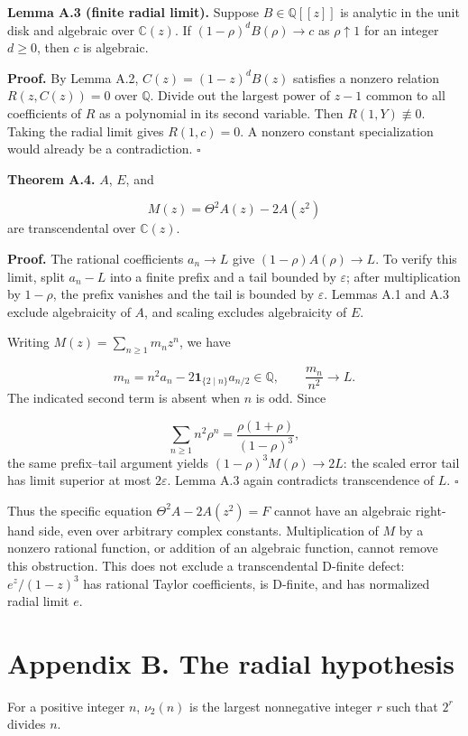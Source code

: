 \documentclass[11pt,a4paper]{article}
\begin{document}
\textbf{Lemma A.3 (finite radial limit).} Suppose $B\in\mathbb Q[[z]]$ is analytic in the unit disk and algebraic over $\mathbb C(z)$. If $(1-\rho)^dB(\rho)\to c$ as $\rho\uparrow1$ for an integer $d\ge0$, then $c$ is algebraic.

\textbf{Proof.} By Lemma A.2, $C(z)=(1-z)^dB(z)$ satisfies a nonzero relation $R(z,C(z))=0$ over $\mathbb Q$. Divide out the largest power of $z-1$ common to all coefficients of $R$ as a polynomial in its second variable. Then $R(1,Y)\not\equiv0$. Taking the radial limit gives $R(1,c)=0$. A nonzero constant specialization would already be a contradiction. $\square$

\textbf{Theorem A.4.} $A$, $E$, and

\[
M(z)=\Theta^2A(z)-2A(z^2)
\]
are transcendental over $\mathbb C(z)$.

\textbf{Proof.} The rational coefficients $a_n\to L$ give $(1-\rho)A(\rho)\to L$. To verify this limit, split $a_n-L$ into a finite prefix and a tail bounded by $\varepsilon$; after multiplication by $1-\rho$, the prefix vanishes and the tail is bounded by $\varepsilon$. Lemmas A.1 and A.3 exclude algebraicity of $A$, and scaling excludes algebraicity of $E$.

Writing $M(z)=\sum_{n\ge1}m_nz^n$, we have

\[
m_n=n^2a_n-2\mathbf1_{\{2\mid n\}}a_{n/2}\in\mathbb Q,\qquad
\frac{m_n}{n^2}\longrightarrow L.
\]
The indicated second term is absent when $n$ is odd. Since

\[
\sum_{n\ge1}n^2\rho^n=\frac{\rho(1+\rho)}{(1-\rho)^3},
\]
the same prefix–tail argument yields $(1-\rho)^3M(\rho)\to2L$: the scaled error tail has limit superior at most $2\varepsilon$. Lemma A.3 again contradicts transcendence of $L$. $\square$

Thus the specific equation $\Theta^2A-2A(z^2)=F$ cannot have an algebraic right-hand side, even over arbitrary complex constants. Multiplication of $M$ by a nonzero rational function, or addition of an algebraic function, cannot remove this obstruction. This does not exclude a transcendental D-finite defect: $e^z/(1-z)^3$ has rational Taylor coefficients, is D-finite, and has normalized radial limit $e$.

\section*{Appendix B. The radial hypothesis}
For a positive integer $n$, $\nu_2(n)$ is the largest nonnegative integer $r$ such that $2^r$ divides $n$.
\end{document}

